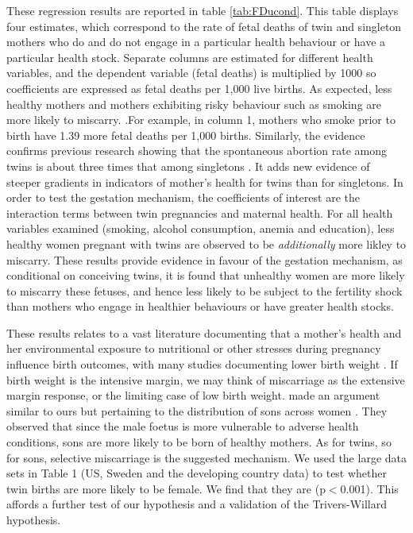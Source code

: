 \documentclass[subeqn]{article}
\begin{document}
\begin{spacing}{1.4}
These regression results are reported in table \ref{tab:FDucond}.  This table
displays four estimates, which correspond to the rate of fetal deaths of twin
and singleton mothers who do and do not engage in a particular health behaviour
or have a particular health stock.  Separate columns are estimated for different
health variables, and the dependent variable (fetal deaths) is multiplied by 1000
so coefficients are expressed as fetal deaths per 1,000 live births. As expected,
less healthy mothers and mothers exhibiting risky behaviour such as smoking are
more likely to miscarry.  .For example, in column 1, mothers who smoke prior to
birth have 1.39 more fetal deaths per 1,000 births.  Similarly, the evidence
confirms previous research showing that the spontaneous abortion rate among twins
is about three times that among singletons \citep{Boklage1990}. It adds new
evidence of steeper gradients in indicators of mother's health for twins than
for singletons.  In order to
test the gestation mechanism, the coefficients of interest are the interaction
terms between twin pregnancies and maternal health.  For all health variables 
examined (smoking, alcohol consumption, anemia and education), less healthy women
pregnant with twins are observed to be \emph{additionally} more likley to
miscarry. These results provide evidence in favour of the gestation mechanism,
as conditional on conceiving twins, it is found that unhealthy women are more 
likely to miscarry these fetuses, and hence less likely to be subject to the
fertility shock than mothers who engage in healthier behaviours or have greater
health stocks.

These results relates to a vast literature documenting that a mother's health and her environmental exposure to nutritional or other stresses during pregnancy influence birth outcomes, with many studies documenting lower birth weight \citep{CurrieMoretti2007,Bernsteinetal2005,SerranoDomeque2014}. If birth weight is the intensive margin, we may think of miscarriage as the extensive margin response, or the limiting case of low birth weight. \citet{TriversWillard1973} made an argument similar to ours but pertaining to the distribution of sons across women \citep{TriversWillard1973,AlmondEdlund2007}. They observed that since the male foetus is more vulnerable to adverse health conditions, sons are more likely to be born of healthy mothers. As for twins, so for sons, selective miscarriage is the suggested mechanism. We used the large data sets in Table 1 (US, Sweden and the developing country data) to test whether twin births are more likely to be female. We find that they are (p$<$0.001). This affords a further test of our hypothesis and a validation of the Trivers-Willard hypothesis.


\end{spacing}
\end{document}
